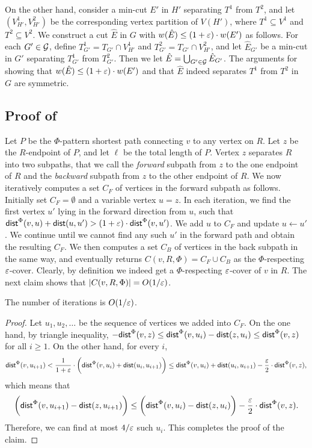 On the other hand, consider a min-cut $E'$ in $H'$ separating $T^1$ from $T^2$, and let $(V_{H'}^1,V_{H'}^2)$ be the corresponding vertex partition of $V(H')$, where $T^1\subseteq V^1$ and $T^2\subseteq V^2$. 
We construct a cut $\hat E$ in $G$ with $w(\hat E)\le (1+{\varepsilon})\cdot w(E')$ as follows. 
For each $G'\in {\mathcal{G}}$, define $T^1_{G'}=T_{G'}\cap V^1_{H'}$ and $T^2_{G'}=T_{G'}\cap V^2_{H'}$, and let $\hat E_{G'}$ be a min-cut in $G'$ separating $T^1_{G'}$ from $T^2_{G'}$. 
Then we let $\hat E=\bigcup_{G'\in {\mathcal{G}}}\hat E_{G'}$.
The arguments for showing that $w(\hat E)\le (1+{\varepsilon})\cdot w(E')$ and that $\hat E$ indeed separates $T^1$ from $T^2$ in $G$ are symmetric.

\subsection{Proof of }
\label{apd: Proof of lem: pattern cover}

Let $P$ be the $\Phi$-pattern shortest path connecting $v$ to any vertex on $R$. Let $z$ be the $R$-endpoint of $P$, and let $\ell$ be the total length of $P$.
Vertex $z$ separates $R$ into two subpaths, that we call the \emph{forward} subpath from $z$ to the one endpoint of $R$ and the \emph{backward} subpath from $z$ to the other endpoint of $R$.
We now iteratively computes a set $C_F$ of vertices in the forward subpath as follows.
Initially set $C_F=\emptyset$ and a variable vertex $u=z$. In each iteration, we find the first vertex $u'$ lying in the forward direction from $u$, such that 
$\textnormal{\textsf{dist}}^{\Phi}(v,u)+\textnormal{\textsf{dist}}(u,u')> (1+{\varepsilon})\cdot \textnormal{\textsf{dist}}^{\Phi}(v,u')$. We add $u$ to $C_F$ and update $u\leftarrow u'$. We continue until we cannot find any such $u'$ in the forward path and obtain the resulting $C_F$.
We then computes a set $C_B$ of vertices in the back subpath in the same way, and eventually returns $C(v,R,\Phi)=C_F\cup C_B$ as the $\Phi$-respecting ${\varepsilon}$-cover.
Clearly, by definition we indeed get a $\Phi$-respecting ${\varepsilon}$-cover of $v$ in $R$. The next claim shows that $|C(v,R,\Phi)|=O(1/{\varepsilon})$.

\begin{claim}
The number of iterations  is $O(1/{\varepsilon})$.
\end{claim}
\begin{proof}
Let $u_1,u_2,\ldots$ be the sequence of vertices we added into $C_F$. On the one hand, by triangle inequality, $-\textnormal{\textsf{dist}}^{\Phi}(v,z)\le \textnormal{\textsf{dist}}^{\Phi}(v,u_i)-\textnormal{\textsf{dist}}(z,u_i)\le \textnormal{\textsf{dist}}^{\Phi}(v,z)$  for all $i\ge 1$. On the other hand, for every $i$, 
$$\textnormal{\textsf{dist}}^{\Phi}(v,u_{i+1})<\frac{1}{1+{\varepsilon}}\cdot \bigg(\textnormal{\textsf{dist}}^{\Phi}(v,u_i)+\textnormal{\textsf{dist}}(u_i,u_{i+1})\bigg)\le \textnormal{\textsf{dist}}^{\Phi}(v,u_i)+\textnormal{\textsf{dist}}(u_i,u_{i+1})-\frac{{\varepsilon}}{2}\cdot \textnormal{\textsf{dist}}^{\Phi}(v,z),$$
which means that
\[
\bigg(\textnormal{\textsf{dist}}^{\Phi}(v,u_{i+1})-\textnormal{\textsf{dist}}(z,u_{i+1})\bigg)\le \bigg(\textnormal{\textsf{dist}}^{\Phi}(v,u_i)-\textnormal{\textsf{dist}}(z,u_i)\bigg)-\frac{{\varepsilon}}{2}\cdot \textnormal{\textsf{dist}}^{\Phi}(v,z).
\]
Therefore, we can find at most $4/{\varepsilon}$ such $u_i$. This completes the proof of the claim.
\end{proof}





